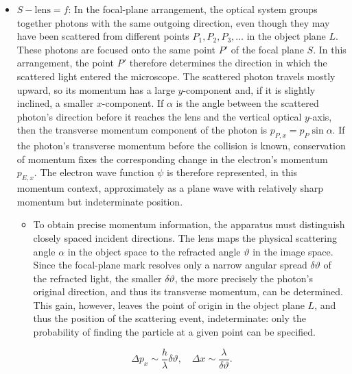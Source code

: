 \documentclass[pdflatex]{sn-jnl}
\newcommand{\pos}{\ensuremath{x}\xspace}
\newcommand{\mom}{\ensuremath{p_x}\xspace}
\begin{document}
\begin{itemize}
\begin{equation*}
\Delta \pos \sim \frac{\lambda}{\sin\epsilon}, \quad \Delta \mom \sim \frac{h}{\lambda}\sin\epsilon.
\end{equation*}

\item $S-\text{lens}=f$: In the focal-plane arrangement, the optical system groups together photons with the same outgoing direction, even though they may have been scattered from different points $P_1,P_2,P_3,\ldots$ in the object plane $L$. These photons are focused onto the same point $P'$ of the focal plane $S$. In this arrangement, the point $P'$ therefore determines the direction in which the scattered light entered the microscope. The scattered photon travels mostly upward, so its momentum has a large $y$-component and, if it is slightly inclined, a smaller $x$-component. If $\alpha$ is the angle between the scattered photon's direction before it reaches the lens and the vertical optical $y$-axis, then the transverse momentum component of the photon is $p_{P,x}=p_P\sin\alpha$. If the photon's transverse momentum before the collision is known, conservation of momentum fixes the corresponding change in the electron's momentum $p_{E,x}$. The electron wave function $\psi$ is therefore represented, in this momentum context, approximately as a plane wave with relatively sharp momentum but indeterminate position.

\begin{itemize}
\item To obtain precise momentum information, the apparatus must distinguish closely spaced incident directions. The lens maps the physical scattering angle $\alpha$ in the object space to the refracted angle $\vartheta$ in the image space. Since the focal-plane mark resolves only a narrow angular spread $\delta\vartheta$ of the refracted light, the smaller $\delta\vartheta$, the more precisely the photon's original direction, and thus its transverse momentum, can be determined. This gain, however, leaves the point of origin in the object plane $L$, and thus the position of the scattering event, indeterminate: only the probability of finding the particle at a given point can be specified.
\end{itemize}


\begin{equation*}
\Delta \mom \sim \frac{h}{\lambda}\delta\vartheta, \quad \Delta \pos \sim \frac{\lambda}{\delta\vartheta}.
\end{equation*}
\end{itemize}
\end{document}
